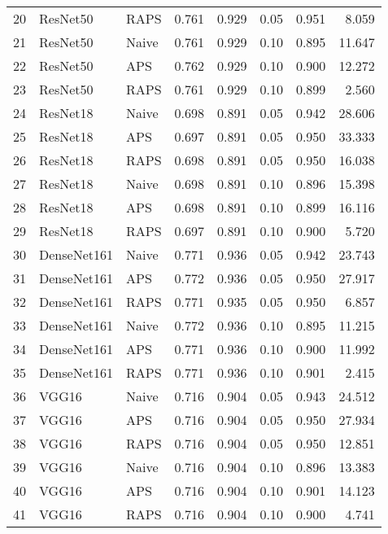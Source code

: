 \begin{tabular}{lllrrrrr}
20 &     ResNet50 &      RAPS &  0.761 &  0.929 &   0.05 &     0.951 &    8.059 \\
21 &     ResNet50 &     Naive &  0.761 &  0.929 &   0.10 &     0.895 &   11.647 \\
22 &     ResNet50 &       APS &  0.762 &  0.929 &   0.10 &     0.900 &   12.272 \\
23 &     ResNet50 &      RAPS &  0.761 &  0.929 &   0.10 &     0.899 &    2.560 \\
24 &     ResNet18 &     Naive &  0.698 &  0.891 &   0.05 &     0.942 &   28.606 \\
25 &     ResNet18 &       APS &  0.697 &  0.891 &   0.05 &     0.950 &   33.333 \\
26 &     ResNet18 &      RAPS &  0.698 &  0.891 &   0.05 &     0.950 &   16.038 \\
27 &     ResNet18 &     Naive &  0.698 &  0.891 &   0.10 &     0.896 &   15.398 \\
28 &     ResNet18 &       APS &  0.698 &  0.891 &   0.10 &     0.899 &   16.116 \\
29 &     ResNet18 &      RAPS &  0.697 &  0.891 &   0.10 &     0.900 &    5.720 \\
30 &  DenseNet161 &     Naive &  0.771 &  0.936 &   0.05 &     0.942 &   23.743 \\
31 &  DenseNet161 &       APS &  0.772 &  0.936 &   0.05 &     0.950 &   27.917 \\
32 &  DenseNet161 &      RAPS &  0.771 &  0.935 &   0.05 &     0.950 &    6.857 \\
33 &  DenseNet161 &     Naive &  0.772 &  0.936 &   0.10 &     0.895 &   11.215 \\
34 &  DenseNet161 &       APS &  0.771 &  0.936 &   0.10 &     0.900 &   11.992 \\
35 &  DenseNet161 &      RAPS &  0.771 &  0.936 &   0.10 &     0.901 &    2.415 \\
36 &        VGG16 &     Naive &  0.716 &  0.904 &   0.05 &     0.943 &   24.512 \\
37 &        VGG16 &       APS &  0.716 &  0.904 &   0.05 &     0.950 &   27.934 \\
38 &        VGG16 &      RAPS &  0.716 &  0.904 &   0.05 &     0.950 &   12.851 \\
39 &        VGG16 &     Naive &  0.716 &  0.904 &   0.10 &     0.896 &   13.383 \\
40 &        VGG16 &       APS &  0.716 &  0.904 &   0.10 &     0.901 &   14.123 \\
41 &        VGG16 &      RAPS &  0.716 &  0.904 &   0.10 &     0.900 &    4.741 \\

\end{tabular}
